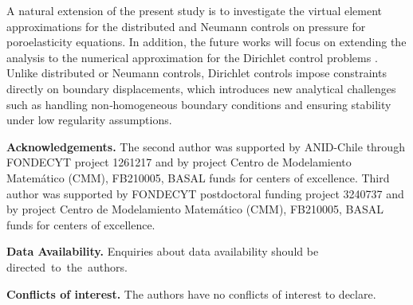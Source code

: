 \documentclass[smallextended]{svjour3}
\numberwithin{equation}{section}
\numberwithin{figure}{section}
\numberwithin{table}{section}
\begin{document}
            A natural extension of the present study is to investigate the virtual element approximations for the distributed and Neumann controls on pressure for poroelasticity equations. In addition, the future works will focus on extending the analysis to the numerical approximation for the Dirichlet control problems \cite{gudi25}. Unlike distributed or Neumann controls, Dirichlet controls impose constraints directly on boundary displacements, which introduces new analytical challenges such as handling non‑homogeneous boundary conditions and ensuring stability under low regularity assumptions.

			
			
			\bigskip
			\small 	
			\noindent\textbf{Acknowledgements.}
			The second author was supported by ANID-Chile through FONDECYT project 1261217 and
            by project Centro de Modelamiento Matem\'atico (CMM), FB210005, BASAL funds for centers of excellence. 
			Third author was supported by FONDECYT postdoctoral funding project 3240737 and by project Centro de Modelamiento Matem\'atico (CMM), FB210005, BASAL funds for centers of excellence.
			
			\small 	
			\noindent\textbf{Data Availability.} Enquiries about data availability should be directed to the authors.
			
			\small 	
			\noindent\textbf{Conflicts of interest.} The authors have no conflicts of interest to declare.
			
\end{document}
